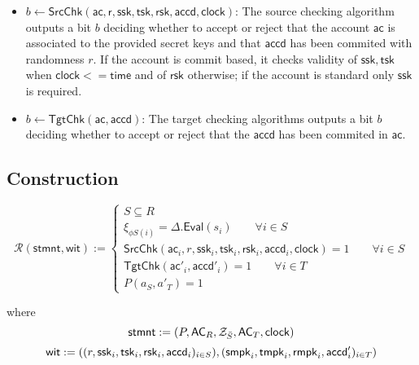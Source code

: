 \documentclass{article}      	%
\begin{document}
\begin{itemize}
\item $b \gets \mathsf{SrcChk}(\mathsf{ac,r,ssk,tsk,rsk,accd,clock})$: The source checking algorithm outputs a bit $b$ deciding whether to accept or reject that the account $\mathsf{ac}$ is associated to the provided secret keys and that $\mathsf{accd}$ has been commited with randomness $r$. If the account is commit based, it checks validity of $\mathsf{ssk,tsk}$ when $\mathsf{clock} <= \mathsf{time}$ and of $\mathsf{rsk}$ otherwise; if the account is standard only $\mathsf{ssk}$ is required.
\item $b \gets \mathsf{TgtChk}(\mathsf{ac,accd})$: The target checking algorithms outputs a bit $b$ deciding whether to accept or reject that the $\mathsf{accd}$ has been commited in $\mathsf{ac}$. 
\end{itemize}


\subsection*{Construction}

\begin{equation*}
\mathcal{R}(\mathsf{stmnt}, \mathsf{wit}) := \begin{cases} 
    S \subseteq R \\ 
    \xi_{\phi S(i)} = \Delta.\mathsf{Eval}(s_i) \qquad \forall i \in S \\
    \mathsf{SrcChk}(\mathsf{ac}_i, r, \mathsf{ssk}_i, \mathsf{tsk}_i, \mathsf{rsk}_i, \mathsf{accd}_i, \mathsf{clock}) = 1 \qquad \forall i \in S \\ 
    \mathsf{TgtChk}(\mathsf{ac'}_i, \mathsf{accd}'_i) = 1 \qquad \forall i \in T \\ 
    P(a_S, a'_T) = 1
\end{cases}
\end{equation*}

where 
\begin{equation*}
\mathsf{stmnt} := (P,\mathsf{AC}_R,\mathcal{Z}_{\bar{S}}, \mathsf{AC}_T, \mathsf{clock}) \\
\end{equation*}
\begin{equation*}
\mathsf{wit} := ((r,\mathsf{ssk}_i, \mathsf{tsk}_i, \mathsf{rsk}_i, \mathsf{accd}_i)_{i\in S}), (\mathsf{smpk}_i, \mathsf{tmpk}_i, \mathsf{rmpk}_i, \mathsf{accd}'_i)_{i\in T}) \\
\end{equation*}
\end{document}
